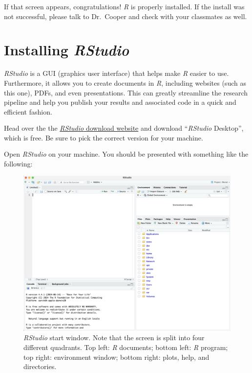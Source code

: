 \documentclass[
  letterpaper,
  DIV=11,
  numbers=noendperiod]{scrreprt}
\begin{document}
If that screen appears, congratulations! \emph{R} is properly installed.
If the install was not successful, please talk to Dr.~Cooper and check
with your classmates as well.

\section{\texorpdfstring{Installing
\emph{RStudio}}{Installing RStudio}}\label{installing-rstudio}

\emph{RStudio} is a GUI (graphics user interface) that helps make
\emph{R} easier to use. Furthermore, it allows you to create documents
in \emph{R}, including websites (such as this one), PDFs, and even
presentations. This can greatly streamline the research pipeline and
help you publish your results and associated code in a quick and
efficient fashion.

Head over the the \href{https://posit.co/downloads/}{\emph{RStudio}
download website} and download ``\emph{RStudio} Desktop'', which is
free. Be sure to pick the correct version for your machine.

Open \emph{RStudio} on your machine. You should be presented with
something like the following:

\begin{figure}[H]

{\centering \includegraphics{images/rstudio_start.png}

}

\caption{\emph{RStudio} start window. Note that the screen is split into
four different quadrants. Top left: \emph{R} documents; bottom left:
\emph{R} program; top right: environment window; bottom right: plots,
help, and directories.}

\end{figure}%
\end{document}
